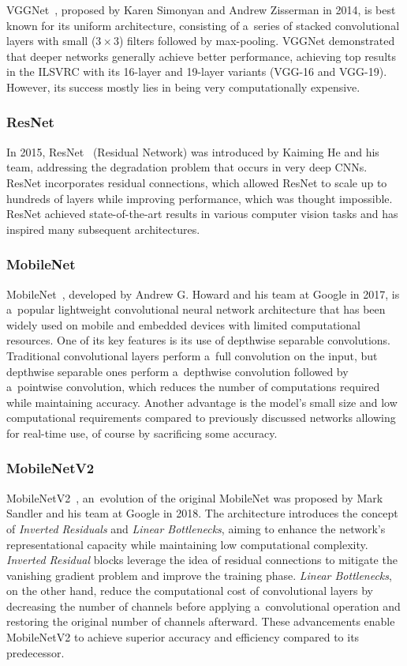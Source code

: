 VGGNet~\cite{Simonyan2014}, proposed by Karen Simonyan and Andrew Zisserman in
2014, is best known for its uniform architecture, consisting of a~series of
stacked convolutional layers with small ($3 \times 3$) filters followed by
max-pooling.  VGGNet demonstrated that deeper networks generally achieve better
performance, achieving top results in the ILSVRC with its 16-layer and 19-layer
variants (VGG-16 and VGG-19). However, its success mostly lies in being very
computationally expensive.


\subsubsection{ResNet}

In 2015, ResNet~\cite{He2015} (Residual Network) was introduced by Kaiming He
and his team, addressing the degradation problem that occurs in very deep CNNs.
ResNet incorporates residual connections, which allowed ResNet to scale up to
hundreds of layers while improving performance, which was thought impossible.
ResNet achieved state-of-the-art results in various computer vision tasks and
has inspired many subsequent architectures.


\subsubsection{MobileNet}

MobileNet~\cite{Howard2017}, developed by Andrew G. Howard and his team at
Google in 2017, is a~popular lightweight convolutional neural network
architecture that has been widely used on mobile and embedded devices with
limited computational resources. One of its key features is its use of depthwise
separable convolutions. Traditional convolutional layers perform a~full
convolution on the input, but depthwise separable ones perform a~depthwise
convolution followed by a~pointwise convolution, which reduces the number of
computations required while maintaining accuracy. Another advantage is the
model's small size and low computational requirements compared to previously
discussed networks allowing for real-time use, of course by sacrificing some
accuracy.


\subsubsection{MobileNetV2}

MobileNetV2~\cite{Sandler2018}, an~evolution of the original MobileNet was
proposed by Mark Sandler and his team at Google in 2018. The architecture
introduces the concept of \textit{Inverted Residuals} and \textit{Linear
Bottlenecks}, aiming to enhance the network's representational capacity while
maintaining low computational complexity. \textit{Inverted Residual} blocks
leverage the idea of residual connections to mitigate the vanishing gradient
problem and improve the training phase. \textit{Linear Bottlenecks}, on the
other hand, reduce the computational cost of convolutional layers by decreasing
the number of channels before applying a~convolutional operation and restoring
the original number of channels afterward. These advancements enable MobileNetV2
to achieve superior accuracy and efficiency compared to its predecessor.


